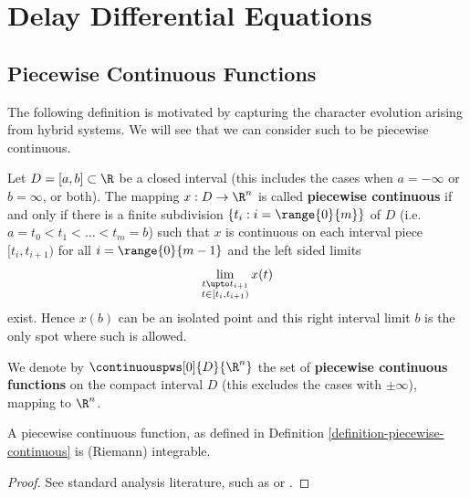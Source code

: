 \chapter{Delay Differential Equations} \label{sec:delay-differential-equations}

\section{Piecewise Continuous Functions} \label{sec:piecewise-continuous-functions}
The following definition is motivated by capturing the character evolution arising from hybrid systems. We will see that we can consider such to be piecewise continuous.

\begin{definition}
    \label{definition-piecewise-continuous}

    Let $D=[a,b]\subset\R$ be a closed interval (this includes the cases when $a=-\infty$ or $b=\infty$, or both). The mapping $x:D\rightarrow\R^n$ is called \textbf{piecewise continuous} if and only if there is a finite subdivision $\{t_i:i=\range{0}{m}\}$ of $D$ (i.e.\ $a=t_0<t_1<\ldots<t_m=b$) such that $x$ is continuous on each interval piece $[t_i,t_{i+1})$ for all $i=\range{0}{m-1}$ and the left sided limits
    \begin{equation}
        \lim_{\substack{t\upto t_{i+1}\\ t\in[t_i,t_{i+1})}} x(t)
    \end{equation}
    exist. Hence $x(b)$ can be an isolated point and this right interval limit $b$ is the only spot where such is allowed.

    We denote by $\continuouspws[0]{D}{\R^n}$ the set of \textbf{piecewise continuous functions} on the compact interval $D$ (this excludes the cases with $\pm\infty$), mapping to $\R^n$.

\end{definition}


\begin{lemma}[]
    \label{lemma-piecewise-continuous-integrable}

    A piecewise continuous function, as defined in Definition \ref{definition-piecewise-continuous} is (Riemann) integrable.
\end{lemma}

\begin{proof}
    See standard analysis literature, such as \cite{rudin1976principles} or \cite{gathmanngrundlagen}.
\end{proof}

